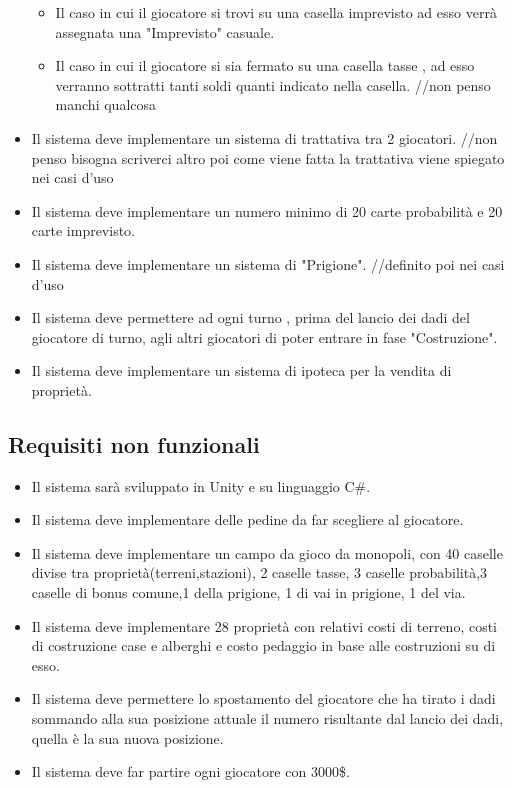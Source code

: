 \documentclass[a4paper]{article}
\begin{document}
\begin{itemize}
\begin{itemize}
\item Il caso in cui il giocatore si trovi su una casella imprevisto ad esso verrà assegnata una "Imprevisto" casuale.
\item Il caso in cui il giocatore si sia fermato su una casella tasse , ad esso verranno sottratti tanti soldi quanti indicato nella casella.  //non penso manchi qualcosa 
\end{itemize}
\item Il sistema deve implementare un sistema di  trattativa tra 2 giocatori.  //non penso bisogna scriverci altro poi come viene fatta la trattativa viene spiegato nei casi d’uso
\item Il sistema deve implementare un numero minimo di 20 carte probabilità e 20 carte imprevisto.
\item Il sistema deve implementare un sistema di "Prigione". //definito poi nei casi d’uso 
\item Il sistema deve permettere ad ogni turno , prima del lancio dei dadi del giocatore di turno, agli altri giocatori di poter  entrare in fase "Costruzione".
\item Il sistema deve implementare un sistema di ipoteca per la vendita di proprietà.
\end{itemize}
\subsection{Requisiti non funzionali}
\begin{itemize}
\item Il sistema sarà sviluppato in Unity e su linguaggio C\#.
\item Il sistema deve implementare delle pedine da far scegliere al giocatore.
\item Il sistema deve implementare un campo da gioco da monopoli, con 40 caselle divise tra proprietà(terreni,stazioni), 2 caselle tasse, 3 caselle probabilità,3 caselle di bonus comune,1 della prigione, 1 di vai in prigione,
1 del via.
\item Il sistema deve implementare 28 proprietà con relativi costi di terreno, costi di costruzione case e alberghi e costo pedaggio in base alle costruzioni su di esso.
\item Il sistema deve permettere lo spostamento del giocatore che ha tirato i dadi sommando alla sua posizione attuale  il numero  risultante dal lancio dei dadi, quella è la sua nuova posizione.
\item Il sistema deve far partire ogni giocatore con 3000\$.
\end{itemize}
\end{document}
